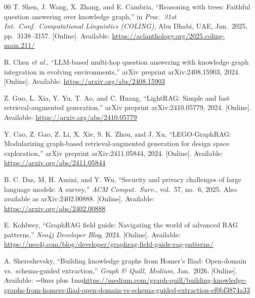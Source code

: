 \documentclass[conference]{IEEEtran}
\begin{document}
\begin{thebibliography}{00}
T. Shen, J. Wang, X. Zhang, and E. Cambria, ``Reasoning with trees: Faithful question answering over knowledge graph,'' in \textit{Proc.\ 31st Int.\ Conf.\ Computational Linguistics (COLING)}, Abu Dhabi, UAE, Jan.\ 2025, pp.\ 3138--3157. [Online]. Available: \url{https://aclanthology.org/2025.coling-main.211/}

R. Chen \textit{et al.}, ``LLM-based multi-hop question answering with knowledge graph integration in evolving environments,'' arXiv preprint arXiv:2408.15903, 2024. [Online]. Available: \url{https://arxiv.org/abs/2408.15903}

Z. Guo, L. Xia, Y. Yu, T. Ao, and C. Huang, ``LightRAG: Simple and fast retrieval-augmented generation,'' arXiv preprint arXiv:2410.05779, 2024. [Online]. Available: \url{https://arxiv.org/abs/2410.05779}

Y. Cao, Z. Gao, Z. Li, X. Xie, S. K. Zhou, and J. Xu, ``LEGO-GraphRAG: Modularizing graph-based retrieval-augmented generation for design space exploration,'' arXiv preprint arXiv:2411.05844, 2024. [Online]. Available: \url{https://arxiv.org/abs/2411.05844}

B. C. Das, M. H. Amini, and Y. Wu, ``Security and privacy challenges of large language models: A survey,'' \textit{ACM Comput.\ Surv.}, vol.~57, no.~6, 2025. Also available as arXiv:2402.00888. [Online]. Available: \url{https://arxiv.org/abs/2402.00888}

E. Kohlwey, ``GraphRAG field guide: Navigating the world of advanced RAG patterns,'' \textit{Neo4j Developer Blog}, 2024. [Online]. Available: \url{https://neo4j.com/blog/developer/graphrag-field-guide-rag-patterns/}

A. Shereshevsky, ``Building knowledge graphs from Homer's Iliad: Open-domain vs.\ schema-guided extraction,'' \textit{Graph \& Quill, Medium}, Jan.\ 2026. [Online]. Available: {\def\UrlBreaks{\do\/\do\-\do\.}\Urlmuskip=0mu plus 1mu\relax\url{https://medium.com/graph-quill/building-knowledge-graphs-from-homers-iliad-open-domain-vs-schema-guided-extraction-ef0bf3874a33}}

\end{thebibliography}
\end{document}
